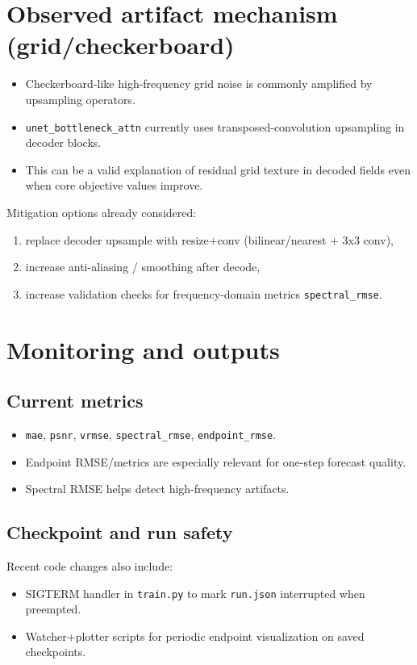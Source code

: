 \documentclass[11pt]{article}
\begin{document}
\section{Observed artifact mechanism (grid/checkerboard)}
\begin{itemize}
  \item Checkerboard-like high-frequency grid noise is commonly amplified by upsampling operators.
  \item \texttt{unet\_bottleneck\_attn} currently uses transposed-convolution upsampling in decoder blocks.
  \item This can be a valid explanation of residual grid texture in decoded fields even when core objective values improve.
\end{itemize}
Mitigation options already considered:
\begin{enumerate}
  \item replace decoder upsample with resize+conv (bilinear/nearest + 3x3 conv),
  \item increase anti-aliasing / smoothing after decode,
  \item increase validation checks for frequency-domain metrics \texttt{spectral\_rmse}.
\end{enumerate}

\section{Monitoring and outputs}
\subsection{Current metrics}
\begin{itemize}
  \item \texttt{mae}, \texttt{psnr}, \texttt{vrmse}, \texttt{spectral\_rmse}, \texttt{endpoint\_rmse}.
  \item Endpoint RMSE/metrics are especially relevant for one-step forecast quality.
  \item Spectral RMSE helps detect high-frequency artifacts.
\end{itemize}

\subsection{Checkpoint and run safety}
Recent code changes also include:
\begin{itemize}
  \item SIGTERM handler in \texttt{train.py} to mark \texttt{run.json} interrupted when preempted.
  \item Watcher+plotter scripts for periodic endpoint visualization on saved checkpoints.
\end{itemize}
\end{document}
